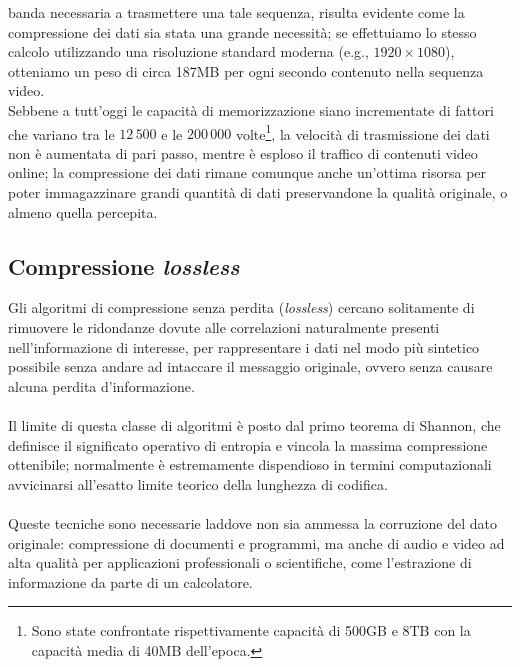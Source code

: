 banda necessaria a trasmettere una tale sequenza, risulta evidente come la 
compressione dei dati sia stata una grande necessità; se effettuiamo lo stesso 
calcolo utilizzando una risoluzione standard moderna (e.g., 
$1920{\times}1080$), 
otteniamo un peso di circa 187MB per ogni secondo contenuto nella sequenza 
video. \\
Sebbene a tutt'oggi le capacità di memorizzazione siano incrementate di fattori
che variano tra le $12\,500$ e le $200\,000$ volte\footnote{Sono state 
confrontate rispettivamente capacità di 500GB e 8TB con la capacità media di 
40MB dell'epoca.}, la velocità di trasmissione dei dati non è aumentata di pari 
passo, mentre è esploso il traffico di contenuti video online; la compressione 
dei dati rimane comunque anche un'ottima risorsa per
poter immagazzinare grandi quantità di dati preservandone la qualità originale, 
o almeno quella percepita.
\subsection{Compressione \emph{lossless}}

Gli algoritmi di compressione senza perdita (\emph{lossless}) cercano 
solitamente di rimuovere le ridondanze dovute alle correlazioni naturalmente 
presenti nell'informazione di interesse, per rappresentare i
dati nel modo più sintetico possibile senza andare ad intaccare il messaggio
originale, ovvero senza causare alcuna perdita d'informazione.
\\ \\ %
Il limite di questa classe di algoritmi è posto dal primo teorema di 
Shannon, che definisce il significato operativo di entropia e vincola la 
massima compressione ottenibile; normalmente è estremamente 
dispendioso in termini computazionali avvicinarsi all'esatto limite teorico 
della lunghezza di codifica. %
\\ \\
Queste tecniche sono necessarie laddove non sia ammessa la corruzione del dato 
originale: compressione di documenti e programmi, ma anche di audio e video ad 
alta qualità per applicazioni professionali o scientifiche, come l'estrazione 
di informazione da parte di un calcolatore.


